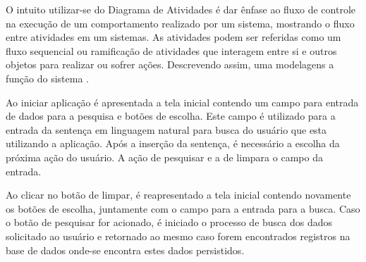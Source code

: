 O intuito utilizar-se do Diagrama de Atividades é dar ênfase ao fluxo de controle na execução de um comportamento realizado por um sistema, mostrando o fluxo entre atividades em um sistemas. As atividades podem ser referidas como um fluxo sequencial ou ramificação de atividades que interagem entre si e outros objetos para realizar ou sofrer ações. Descrevendo assim, uma modelagens a função do sistema \cite{Booch:2012}.  

Ao iniciar aplicação é apresentada a tela inicial contendo um campo para entrada de dados para a pesquisa e botões de escolha. Este campo é utilizado para a entrada da sentença em linguagem natural para busca do usuário que esta utilizando a aplicação. Após a inserção da sentença, é necessário a escolha da próxima ação do usuário. A ação de pesquisar e a de limpara o campo da entrada.

Ao clicar no botão de limpar, é reapresentado a tela inicial contendo novamente os botões de escolha, juntamente com o campo para a entrada para a busca. Caso o botão de pesquisar for acionado, é iniciado o processo de busca dos dados solicitado ao usuário e retornado ao mesmo caso forem encontrados registros na base de dados onde-se encontra estes dados persistidos.
